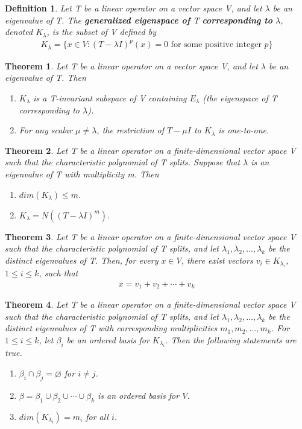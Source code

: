 \documentclass{article}
\newcommand{\bd}[1]{\textbf{#1}}
\newcommand{\enumalph}[0]{\begin{enumerate}[label=(\alph*)]}
\theoremstyle{plain}
\newtheorem{theorem}{Theorem}[section]
\newtheorem*{definition1}{Definition}
\theoremstyle{plain} %
\begin{document}
\begin{definition1}
  Let T be a linear operator on a vector space V, and let $\lambda$ be an eigenvalue of T. The \bd{generalized eigenspace of} T \bd{corresponding to} $\lambda$, denoted $K_\lambda$, is the subset of V defined by
  \begin{align*}
    K_\lambda = \{ x \in V : (T-\lambda I)^p(x) = 0\text{ for some positive integer }p\}
  \end{align*}
\end{definition1}

\begin{theorem}
  Let T be a linear operator on a vector space V, and let $\lambda$ be an eigenvalue of T. Then
  \enumalph
    \item $K_\lambda$ is a T-invariant subspace of V containing $E_\lambda$ (the eigenspace of T corresponding to $\lambda$).
    \item For any scalar $\mu \neq \lambda$, the restriction of $T − \mu I$ to $K_\lambda$ is one-to-one.
  \end{enumerate}
\end{theorem}

\begin{theorem}
  Let T be a linear operator on a finite-dimensional vector space V such that the characteristic polynomial of T splits. Suppose that $\lambda$ is an eigenvalue of T with multiplicity m. Then
  \enumalph
    \item $dim(K_\lambda)\leq m$.
    \item $K_\lambda = N((T-\lambda I)^m)$.
  \end{enumerate}
\end{theorem}

\begin{theorem}
  Let T be a linear operator on a finite-dimensional vector space V such that the characteristic polynomial of T splits, and let $\lambda_1, \lambda_2, \ldots , \lambda_k$ be the distinct eigenvalues of T. Then, for every $x \in V$, there exist vectors $v_i \in K_{\lambda_i}$, $1 \leq i \leq k$, such that
  \begin{align*}
    x=v_1+v_2+\cdots+v_k
  \end{align*}
\end{theorem}


\begin{theorem}
  Let T be a linear operator on a finite-dimensional vector space V such that the characteristic polynomial of T splits, and let $\lambda_1, \lambda_2, \ldots , \lambda_k$ be the distinct eigenvalues of T with corresponding multiplicities $m_1, m_2, \ldots , m_k$. For $1 \leq i \leq k$, let $\beta_i$ be an ordered basis for $K_{\lambda_i}$. Then the following statements are true.
  \enumalph
    \item $\beta_i\cap \beta_j=\varnothing$ for $i\neq j$.
    \item $\beta=\beta_1\cup\beta_2\cup\cdots\cup\beta_k$ is an ordered basis for $V$.
    \item $dim(K_{\lambda_i}) = m_i$ for all $i$.
  \end{enumerate}
\end{theorem}
\end{document}
